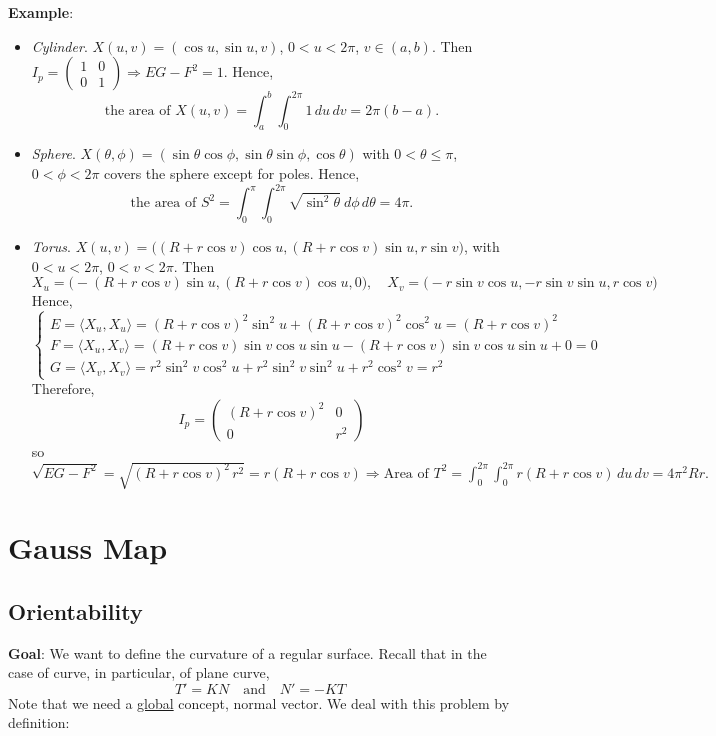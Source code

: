 \noindent\textbf{Example}:
\begin{itemize}
\item \textit{Cylinder}. $X(u, v) = (\cos u, \sin u, v)$, $0 < u < 2\pi$, $v\in(a, b)$. Then $I_p = \begin{pmatrix}1 & 0\\ 0 & 1\end{pmatrix} \Rightarrow EG - F^2 = 1$. Hence,
\[
\text{the area of } X(u, v) = \int_a^b\int_0^{2\pi}1\,du\,dv = 2\pi(b - a).
\]
\item \textit{Sphere}. $X(\theta, \phi) = (\sin\theta\cos\phi, \sin\theta\sin\phi, \cos\theta)$ with $0 < \theta\le\pi$, $0 < \phi < 2\pi$ covers the sphere except for poles. Hence,
\[
\text{the area of } S^2 = \int_0^\pi\int_0^{2\pi}\sqrt{\sin^2\theta}\ d\phi\,d\theta = 4\pi.
\]
\item \textit{Torus}. $X(u, v) = \big((R + r\cos v)\cos u, (R + r\cos v)\sin u, r\sin v\big)$, with $0 < u < 2\pi$, $0 < v < 2\pi$. Then
\[
X_u = \big(-(R + r\cos v)\sin u, (R + r\cos v)\cos u, 0\big), \quad X_v = \big(-r\sin v\cos u, -r\sin v\sin u, r\cos v\big)
\]
Hence,
\[
\begin{cases}
E = \langle X_u, X_u\rangle = (R + r\cos v)^2\sin^2 u + (R + r\cos v)^2\cos^2 u = (R + r\cos v)^2\\[2mm]
F = \langle X_u, X_v\rangle = (R + r\cos v)\sin v\cos u\sin u - (R + r\cos v)\sin v\cos u\sin u + 0 = 0\\[2mm]
G = \langle X_v, X_v\rangle = r^2\sin^2 v\cos^2 u + r^2\sin^2 v\sin^2 u + r^2\cos^2 v = r^2
\end{cases}
\]
Therefore,
\[
I_p = \begin{pmatrix}(R + r\cos v)^2 & 0\\ 0 & r^2\end{pmatrix}
\]
so $\sqrt{EG - F^2} = \sqrt{(R + r\cos v)^2\,r^2} = r(R + r\cos v) \Rightarrow \text{Area of } T^2 = \int_0^{2\pi}\int_0^{2\pi}r(R + r\cos v)\,du\,dv = 4\pi^2 Rr.
$
\end{itemize}

\section{Gauss Map}

\subsection{Orientability}

\noindent\textbf{Goal}: We want to define the curvature of a regular surface. Recall that in the case of curve, in particular, of plane curve,
\[
T' = KN \quad\text{and}\quad N' = -KT
\]
Note that we need a \underline{global} concept, normal vector. We deal with this problem by definition:

